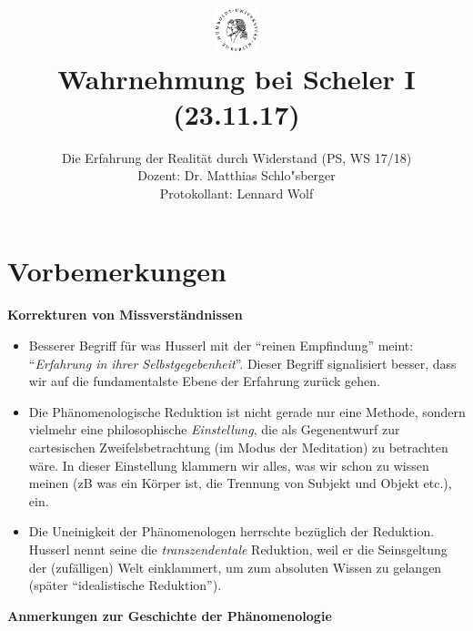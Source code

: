 \documentclass[a4paper, emulatestandardclasses]{scrartcl}
\date{\vspace{-3ex}}
\begin{document}
\title{
    \vspace{-30pt}
	\includegraphics*[width=0.1\textwidth,right]{ErstesSem/images/hu_logo2.png}\\
	\vspace{-10pt}
	Wahrnehmung bei Scheler I (23.11.17)}%
	\subtitle{Die Erfahrung der Realität durch Widerstand (PS, WS 17/18)\\
          Dozent: Dr. Matthias Schlo"sberger\\
          Protokollant: Lennard Wolf}
\maketitle
\vspace{-40pt}

\section*{Vorbemerkungen}
\textbf{Korrekturen von Missverständnissen}

\begin{itemize}
  \item Besserer Begriff für was Husserl mit der "`reinen Empfindung"' meint: "`\emph{Erfahrung in ihrer Selbstgegebenheit}"'. Dieser Begriff signalisiert besser, dass wir auf die fundamentalste Ebene der Erfahrung zurück gehen.
  \item Die Phänomenologische Reduktion ist nicht gerade nur eine Methode, sondern vielmehr eine philosophische \emph{Einstellung}, die als Gegenentwurf zur cartesischen Zweifelsbetrachtung (im Modus der Meditation) zu betrachten wäre. In dieser Einstellung klammern wir alles, was wir schon zu wissen meinen (zB was ein Körper ist, die Trennung von Subjekt und Objekt etc.), ein. 
  \item Die Uneinigkeit der Phänomenologen herrschte bezüglich der Reduktion. Husserl nennt seine die \emph{transzendentale} Reduktion, weil er die Seinsgeltung der (zufälligen) Welt einklammert, um zum absoluten Wissen zu gelangen (später "`idealistische Reduktion"').
\end{itemize}

\noindent\textbf{Anmerkungen zur Geschichte der Phänomenologie}\newline
\end{document}
